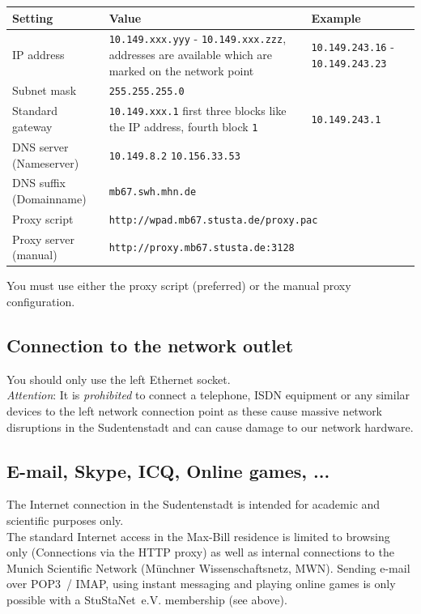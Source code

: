 \documentclass[a4paper,12pt]{scrartcl}
\begin{document}
\begin{center}
  \begin{tabularx}{\linewidth}{|lXp{.2\linewidth}|}
    \hline
    Setting & Value & Example \\
    \hline \hline
    IP address & \nolinkurl{10.149.xxx.yyy} - \nolinkurl{10.149.xxx.zzz}, \newline 8 addresses are available which are marked on the network point & \nolinkurl{10.149.243.16} - \nolinkurl{10.149.243.23} \\
    \hline
    Subnet mask & \nolinkurl{255.255.255.0} & \\
    \hline
    Standard gateway & \nolinkurl{10.149.xxx.1} \newline first three blocks like the IP address, fourth block \nolinkurl{1} & \nolinkurl{10.149.243.1} \\
    \hline
		  DNS server (Nameserver) & \nolinkurl{10.149.8.2} \newline \nolinkurl{10.156.33.53} & \\
    \hline
    DNS suffix (Domainname) & \nolinkurl{mb67.swh.mhn.de} & \\
    \hline
    Proxy script & \multicolumn{2}{l|}{\nolinkurl{http://wpad.mb67.stusta.de/proxy.pac}} \\
    \hline
    Proxy server (manual) & \multicolumn{2}{l|}{\nolinkurl{http://proxy.mb67.stusta.de:3128}} \\
    \hline
  \end{tabularx}
\end{center}
You must use either the proxy script (preferred) or the manual proxy configuration.

\subsection*{Connection to the network outlet}

You should only use the left Ethernet socket.
\\
\emph{Attention}: It is \emph{prohibited} to connect a telephone, ISDN equipment or any similar devices to the left network connection point as these cause massive network disruptions in the Sudentenstadt and can cause damage to our network hardware.

\subsection*{E-mail, Skype, ICQ, Online games, ...}

The Internet connection in the Sudentenstadt is intended for academic and scientific purposes only.
\\
The standard Internet access in the Max-Bill residence is limited to browsing only (Connections via the HTTP proxy) as well as internal connections to the Munich Scientific Network (Münchner Wissenschaftsnetz, MWN). Sending e-mail over POP3~/ IMAP, using instant messaging and playing online games is only possible with a StuStaNet~e.V. membership (see above).
\end{document}
